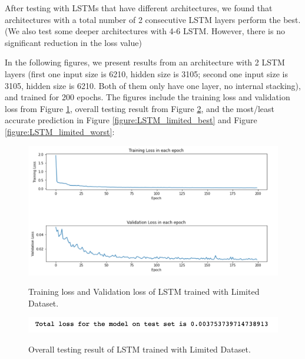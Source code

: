 After testing with LSTMs that have different architectures, we found that architectures with a total number of 2 consecutive LSTM layers perform the best. (We also test some deeper architectures with 4-6 LSTM. However, there is no significant reduction in the loss value)

In the following figures, we present results from an architecture with 2 LSTM layers (first one input size is 6210, hidden size is 3105; second one input size is 3105, hidden size is 6210. Both of them only have one layer, no internal stacking), and trained for 200 epochs. The figures include the training loss and validation loss from Figure \ref{figure:LSTM_limited_losses}, overall testing result from Figure \ref{figure:LSTM_limited_testing}, and the most/least accurate prediction in Figure \ref{figure:LSTM_limited_best} and Figure \ref{figure:LSTM_limited_worst}:

\begin{figure}[H]
    \caption{Training loss and Validation loss of LSTM trained with Limited Dataset.}
    \includegraphics[scale=0.6]{figures/mantle_convection_images/limited_dataset/LSTM_trainingData.png}
    \label{figure:LSTM_limited_losses}
\end{figure}

\begin{figure}[H]
    \caption{Overall testing result of LSTM trained with Limited Dataset.}
    \includegraphics[scale=0.8]{figures/mantle_convection_images/limited_dataset/LSTM_OverallTesting.png}
    \label{figure:LSTM_limited_testing}
\end{figure}

